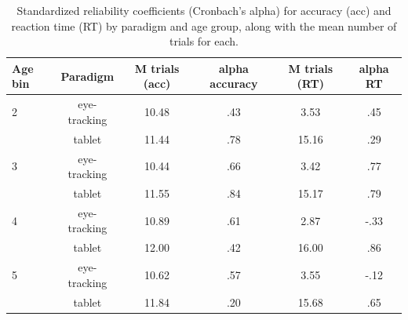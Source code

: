 \documentclass{rsos}
\begin{document}
\begin{table}[!h]
\centering
\begin{tabular}{lccccc}
 Age bin & Paradigm & M trials (acc) & alpha accuracy & M trials (RT) & alpha RT \\ 
  \hline
2 & eye-tracking & 10.48 & .43 & 3.53 & .45 \\ 
    & tablet & 11.44 & .78 & 15.16 & .29 \\ 
  3 & eye-tracking & 10.44 & .66 & 3.42 & .77 \\ 
    & tablet & 11.55 & .84 & 15.17 & .79 \\ 
  4 & eye-tracking & 10.89 & .61 & 2.87 & -.33 \\ 
    & tablet & 12.00 & .42 & 16.00 & .86 \\ 
  5 & eye-tracking & 10.62 & .57 & 3.55 & -.12 \\ 
    & tablet & 11.84 & .20 & 15.68 & .65 \\ 
   \hline
\end{tabular}
\caption{Standardized reliability coefficients (Cronbach's alpha) for accuracy (acc) and reaction time (RT) by paradigm and age group, along with the mean number of trials for each.} 
\label{tab:etip_rel}
\end{table}
\end{document}
